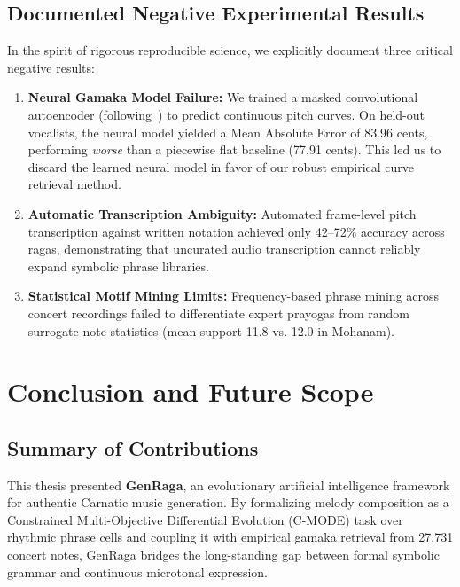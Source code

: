 \documentclass[12pt,a4paper]{report}
\newcommand{\cmode}{C-MODE}
\begin{document}
\section{Documented Negative Experimental Results}
In the spirit of rigorous reproducible science, we explicitly document three critical negative results:
\begin{enumerate}
    \item \textbf{Neural Gamaka Model Failure:} We trained a masked convolutional autoencoder (following~\cite{gamaka2022}) to predict continuous pitch curves. On held-out vocalists, the neural model yielded a Mean Absolute Error of 83.96 cents, performing \textit{worse} than a piecewise flat baseline (77.91 cents). This led us to discard the learned neural model in favor of our robust empirical curve retrieval method.
    \item \textbf{Automatic Transcription Ambiguity:} Automated frame-level pitch transcription against written notation achieved only 42--72\% accuracy across ragas, demonstrating that uncurated audio transcription cannot reliably expand symbolic phrase libraries.
    \item \textbf{Statistical Motif Mining Limits:} Frequency-based phrase mining across concert recordings failed to differentiate expert prayogas from random surrogate note statistics (mean support 11.8 vs. 12.0 in Mohanam).
\end{enumerate}

\chapter{Conclusion and Future Scope}

\section{Summary of Contributions}
This thesis presented \textbf{GenRaga}, an evolutionary artificial intelligence framework for authentic Carnatic music generation. By formalizing melody composition as a Constrained Multi-Objective Differential Evolution (\cmode) task over rhythmic phrase cells and coupling it with empirical gamaka retrieval from 27,731 concert notes, GenRaga bridges the long-standing gap between formal symbolic grammar and continuous microtonal expression.
\end{document}
